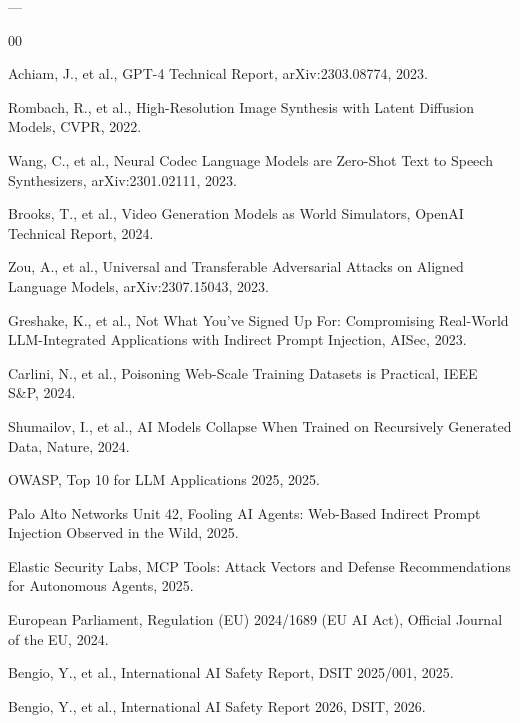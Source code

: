 ––\documentclass[preprint,12pt]{elsarticle}
\begin{document}
\begin{thebibliography}{00}

  Achiam, J., et al.,
  GPT-4 Technical Report,
  arXiv:2303.08774, 2023.

  Rombach, R., et al.,
  High-Resolution Image Synthesis with Latent Diffusion Models,
  CVPR, 2022.

  Wang, C., et al.,
  Neural Codec Language Models are Zero-Shot Text to Speech Synthesizers,
  arXiv:2301.02111, 2023.

  Brooks, T., et al.,
  Video Generation Models as World Simulators,
  OpenAI Technical Report, 2024.

  Zou, A., et al.,
  Universal and Transferable Adversarial Attacks on Aligned Language Models,
  arXiv:2307.15043, 2023.

  Greshake, K., et al.,
  Not What You've Signed Up For: Compromising Real-World LLM-Integrated Applications with Indirect Prompt Injection,
  AISec, 2023.

  Carlini, N., et al.,
  Poisoning Web-Scale Training Datasets is Practical,
  IEEE S\&P, 2024.

  Shumailov, I., et al.,
  AI Models Collapse When Trained on Recursively Generated Data,
  Nature, 2024.

  OWASP,
  Top 10 for LLM Applications 2025,
  2025.

  Palo Alto Networks Unit 42,
  Fooling AI Agents: Web-Based Indirect Prompt Injection Observed in the Wild,
  2025.

  Elastic Security Labs,
  MCP Tools: Attack Vectors and Defense Recommendations for Autonomous Agents,
  2025.

  European Parliament,
  Regulation (EU) 2024/1689 (EU AI Act),
  Official Journal of the EU, 2024.

  Bengio, Y., et al.,
  International AI Safety Report,
  DSIT 2025/001, 2025.

  Bengio, Y., et al.,
  International AI Safety Report 2026,
  DSIT, 2026.


\end{thebibliography}
\end{document}
